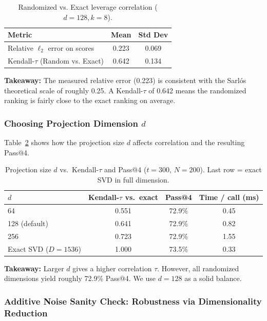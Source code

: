 \documentclass[11pt]{article}
\begin{document}
\begin{table}[H]
\centering
\caption{Randomized vs. Exact leverage correlation ($d=128, k=8$).}
\label{tab:stability-cross-run}
\begin{tabular}{lcc}
\toprule
\textbf{Metric} & \textbf{Mean} & \textbf{Std Dev} \\
\midrule
Relative $\ell_2$ error on scores & 0.223 & 0.069 \\
Kendall-$\tau$ (Random vs. Exact) & 0.642 & 0.134 \\
\bottomrule
\end{tabular}
\end{table}

\textbf{Takeaway:} The measured relative error (0.223) is consistent with the Sarlós theoretical scale
 of roughly 0.25. A Kendall-$\tau$ of 0.642 means the randomized ranking is fairly close to the exact ranking
  on average.

\subsubsection{Choosing Projection Dimension $d$}
Table~\ref{tab:ablation-d} shows how the projection size $d$ affects correlation and the resulting Pass@4.


\begin{table}[ht]
\centering
\caption{Projection size $d$ vs.\ Kendall-$\tau$ and Pass@4 ($t{=}300$, $N{=}200$). Last row = exact SVD in full dimension.}
\label{tab:ablation-d}
\begin{tabular}{lccc}
\toprule
\textbf{$d$} & \textbf{Kendall-$\tau$ vs.\ exact} & \textbf{Pass@4} & \textbf{Time / call (ms)} \\
\midrule
64 & 0.551 & 72.9\% & 0.45 \\
128 (default) & 0.641 & 72.9\% & 0.82 \\
256 & 0.723 & 72.9\% & 1.55 \\
Exact SVD ($D{=}1536$) & 1.000 & 73.5\% & 0.33 \\
\bottomrule
\end{tabular}
\end{table}
\textbf{Takeaway:} Larger $d$ gives a higher correlation $\tau$. However, all randomized dimensions yield roughly
 72.9\% Pass@4. We use $d=128$ as a solid balance.

\subsubsection{Additive Noise Sanity Check: Robustness via Dimensionality Reduction}
\label{sec:noise-injection}
\end{document}
